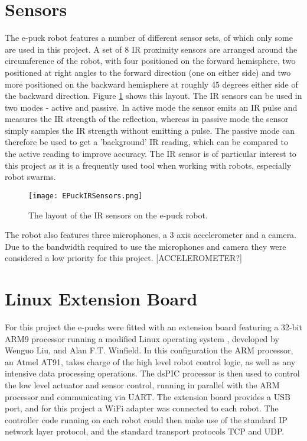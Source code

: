\section{Sensors}
The e-puck robot features a number of different sensor sets, of which only some are used in this project. A set of 8 IR proximity sensors are arranged around the circumference of the robot, with four positioned on the forward hemisphere, two positioned at right angles to the forward direction (one on either side) and two more positioned on the backward hemisphere at roughly 45 degrees either side of the backward direction. Figure \ref{fig:EPuckIRSensors} shows this layout. The IR sensors can be used in two modes - active and passive. In active mode the sensor emits an IR pulse and measures the IR strength of the reflection, whereas in passive mode the sensor simply samples the IR strength without emitting a pulse. The passive mode can therefore be used to get a 'background' IR reading, which can be compared to the active reading to improve accuracy. The IR sensor is of particular interest to this project as it is a frequently used tool when working with robots, especially robot swarms.

\begin{figure}
	\begin{center}
	\texttt{[image: EPuckIRSensors.png]}
	\decoRule
	\caption[e-puck IR Sensor Layout]{The layout of the IR sensors on the e-puck robot.}
	\label{fig:EPuckIRSensors}
	\end{center}
\end{figure}

The robot also features three microphones, a 3 axis accelerometer and a camera. Due to the bandwidth required to use the microphones and camera they were considered a low priority for this project. [ACCELEROMETER?] 


\section{Linux Extension Board} \label{LinuxExtensionBoard}
For this project the e-pucks were fitted with an extension board featuring a 32-bit ARM9 processor running a modified Linux operating system \cite{LinuxExtensionBoard}, developed by Wenguo Liu, and Alan F.T. Winfield. In this configuration the ARM processor, an Atmel AT91, takes charge of the high level robot control logic, as well as any intensive data processing operations. The dsPIC processor is then used to control the low level actuator and sensor control, running in parallel with the ARM processor and communicating via UART. The extension board provides a USB port, and for this project a WiFi adapter was connected to each robot. The controller code running on each robot could then make use of the standard IP network layer protocol, and the standard transport protocols TCP and UDP.

